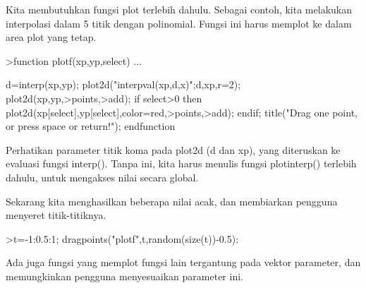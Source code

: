 \documentclass{article}
\begin{document}
\begin{eulernotebook}
\begin{eulercomment}
\begin{eulercomment}
\begin{eulercomment}
\begin{eulercomment}
\begin{eulercomment}
\begin{eulercomment}
\begin{eulercomment}
\begin{eulercomment}
\begin{eulercomment}
Kita membutuhkan fungsi plot terlebih dahulu. Sebagai contoh, kita
melakukan interpolasi dalam 5 titik dengan polinomial. Fungsi ini
harus memplot ke dalam area plot yang tetap.
\end{eulercomment}
\begin{eulerprompt}
>function plotf(xp,yp,select) ...
\end{eulerprompt}
\begin{eulerudf}
    d=interp(xp,yp);
    plot2d("interpval(xp,d,x)";d,xp,r=2);
    plot2d(xp,yp,>points,>add);
    if select>0 then
      plot2d(xp[select],yp[select],color=red,>points,>add);
    endif;
    title("Drag one point, or press space or return!");
  endfunction
\end{eulerudf}
\begin{eulercomment}
Perhatikan parameter titik koma pada plot2d (d dan xp), yang
diteruskan ke evaluasi fungsi interp(). Tanpa ini, kita harus menulis
fungsi plotinterp() terlebih dahulu, untuk mengakses nilai secara
global.

Sekarang kita menghasilkan beberapa nilai acak, dan membiarkan
pengguna menyeret titik-titiknya.
\end{eulercomment}
\begin{eulerprompt}
>t=-1:0.5:1; dragpoints("plotf",t,random(size(t))-0.5):
\end{eulerprompt}
\begin{eulercomment}
Ada juga fungsi yang memplot fungsi lain tergantung pada vektor
parameter, dan memungkinkan pengguna menyesuaikan parameter ini.


\end{eulercomment}
\end{eulercomment}
\end{eulercomment}
\end{eulercomment}
\end{eulercomment}
\end{eulercomment}
\end{eulercomment}
\end{eulercomment}
\end{eulercomment}
\end{eulernotebook}
\end{document}
